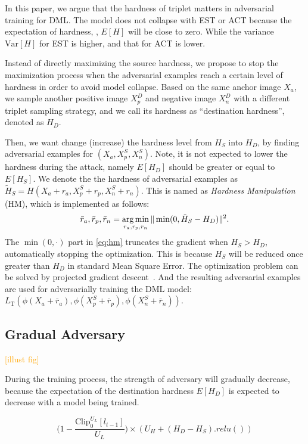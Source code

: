 \documentclass[10pt,twocolumn,letterpaper]{article}
\newcommand{\oo}[1]{\textcolor{orange}{#1}}
\begin{document}
In this paper, we argue that the hardness of triplet matters in adversarial
training for DML.
%
The model does not collapse with EST or ACT because the expectation of hardness,
\ie, $E[H]$ will be close to zero.
%
While the variance $\text{Var}[H]$ for EST is higher, and that for ACT is lower.

Instead of directly maximizing the source hardness, we propose to stop the
maximization process when the adversarial examples reach a certain level of
hardness in order to avoid model collapse.
%
Based on the same anchor image $X_a$, we sample another positive image $X_p^D$
and negative image $X_n^D$ with a different triplet sampling strategy, and
we call its hardness as ``destination hardness'', denoted as $H_D$.

Then, we want change (increase) the hardness level from $H_S$ into $H_D$, by
finding adversarial examples for $(X_a, X_p^S, X_n^S)$.
%
Note, it is not expected to lower the hardness during the attack, namely
$E[H_D]$ should be greater or equal to $E[H_S]$.
%
We denote the the hardness of adversarial examples as $\tilde{H}_S=H(X_a{+}r_a,
X_p^S{+}r_p, X_n^S{+}r_n)$.
%
This is named as \emph{Hardness Manipulation} (HM), which is implemented as
follows:
%
\begin{equation}
	\bar{r}_a, \bar{r}_p, \bar{r}_n = \operatorname*{arg\,min}_{r_a,r_p,r_n} \|\min(0,
	\tilde{H}_S-H_D)\|^2.
	\label{eq:hm}
\end{equation}
%
The $\min(0,\cdot)$ part in \cref{eq:hm} truncates the gradient when $H_S>H_D$,
automatically stopping the optimization.
%
This is because $H_S$ will be reduced once greater than $H_D$ in standard Mean
Square Error.
%
The optimization problem can be solved by projected gradient
descent~\cite{madry}.
%
And the resulting adversarial examples are used for adversarially training the
DML model:
%
$L_\text{T}(\phi(X_a+\bar{r}_a), \phi(X_p^S+\bar{r}_p),
\phi(X_n^S+\bar{r}_n))$.

\subsection{Gradual Adversary}

\oo{[illust fig]}

During the training process, the strength of adversary will gradually decrease,
because the expectation of the destination hardness $E[H_D]$ is expected to
decrease with a model being trained.


\[
	\big(1-\frac{\text{Clip}_0^{U_L}[l_{t-1}]}{U_L} \big)\times
	(U_H + (H_D - H_S).relu())
\]
\end{document}
